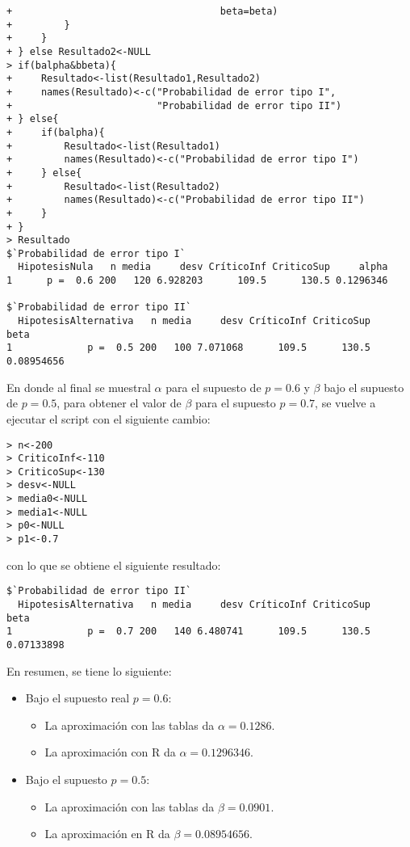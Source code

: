 \begin{solucion}
\begin{verbatim}
+                                    beta=beta)
+         }
+     }
+ } else Resultado2<-NULL
> if(balpha&bbeta){
+     Resultado<-list(Resultado1,Resultado2)
+     names(Resultado)<-c("Probabilidad de error tipo I",
+                         "Probabilidad de error tipo II")
+ } else{
+     if(balpha){
+         Resultado<-list(Resultado1)
+         names(Resultado)<-c("Probabilidad de error tipo I")
+     } else{
+         Resultado<-list(Resultado2)
+         names(Resultado)<-c("Probabilidad de error tipo II")
+     }
+ }
> Resultado
$`Probabilidad de error tipo I`
  HipotesisNula   n media     desv CríticoInf CriticoSup     alpha
1      p =  0.6 200   120 6.928203      109.5      130.5 0.1296346

$`Probabilidad de error tipo II`
  HipotesisAlternativa   n media     desv CríticoInf CriticoSup       beta
1             p =  0.5 200   100 7.071068      109.5      130.5 0.08954656
 \end{verbatim}
 \vspace{-0.5cm}
 En donde al final se muestral $\alpha$ para el supuesto de $p = 0.6$ y $\beta$ bajo el supuesto de $p = 0.5$, para obtener el valor de $\beta$ para el supuesto $p = 0.7$, se vuelve a ejecutar el script con el siguiente cambio:
 \begin{verbatim}
> n<-200
> CriticoInf<-110
> CriticoSup<-130
> desv<-NULL
> media0<-NULL
> media1<-NULL
> p0<-NULL
> p1<-0.7
 \end{verbatim}
 \vspace{-0.5cm}
 con lo que se obtiene el siguiente resultado:
 \begin{verbatim}
$`Probabilidad de error tipo II`
  HipotesisAlternativa   n media     desv CríticoInf CriticoSup       beta
1             p =  0.7 200   140 6.480741      109.5      130.5 0.07133898
 \end{verbatim}
 \vspace{-0.5cm}
 En resumen, se tiene lo siguiente:
 \begin{itemize}
  \item Bajo el supuesto real $p = 0.6$:
  \begin{itemize}
   \item La aproximaci\'on con las tablas da $\alpha = 0.1286$.
   \item La aproximaci\'on con R da $\alpha = 0.1296346$.
  \end{itemize}

  \item Bajo el supuesto $p = 0.5$:
  \begin{itemize}
   \item La aproximaci\'on con las tablas da $\beta = 0.0901$.
   \item La aproximaci\'on en R da $\beta = 0.08954656$.
  \end{itemize}


\end{itemize}
\end{solucion}
